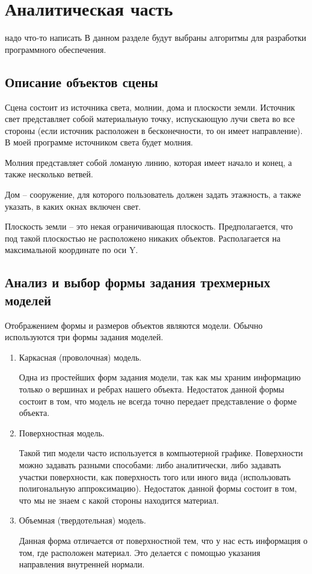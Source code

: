 \chapter{Аналитическая часть}
надо что-то написать
В данном разделе будут выбраны алгоритмы для разработки программного обеспечения.
\section{Описание объектов сцены}

Сцена состоит из источника света, молнии, дома и плоскости земли.
Источник свет представляет собой материальную точку, испускающую лучи света во все стороны (если источник расположен в бесконечности, то он имеет направление). В моей программе источником света будет молния.

Молния представляет собой ломаную линию, которая имеет начало и конец, а также несколько ветвей. 

Дом – сооружение, для которого пользователь должен задать этажность, а также указать, в каких окнах включен свет.

Плоскость земли – это некая ограничивающая плоскость. Предполагается, что под такой плоскостью не расположено никаких объектов. Располагается на максимальной координате по оси Y. 


\section{Анализ и выбор формы задания трехмерных моделей}

Отображением формы и размеров объектов являются модели. 
Обычно используются три формы задания моделей.

\begin{enumerate}
	\item Каркасная (проволочная) модель.
	
	Одна из простейших форм задания модели, так как мы храним информацию только о вершинах и ребрах нашего объекта. Недостаток данной формы состоит в том, что модель не всегда точно передает представление о форме объекта.
	
	\item Поверхностная модель.
	
	Такой тип модели часто используется в компьютерной графике. Поверхности можно задавать разными способами: либо аналитически, либо задавать участки поверхности, как поверхность того или иного вида (использовать полигональную аппроксимацию). Недостаток данной формы состоит в том, что мы не знаем с какой стороны находится материал.
	
	\item  Объемная (твердотельная) модель.
	
	Данная форма отличается от поверхностной тем, что у нас есть информация о том, где расположен материал. Это делается с помощью указания направления внутренней нормали. 
	
\end{enumerate}
	
